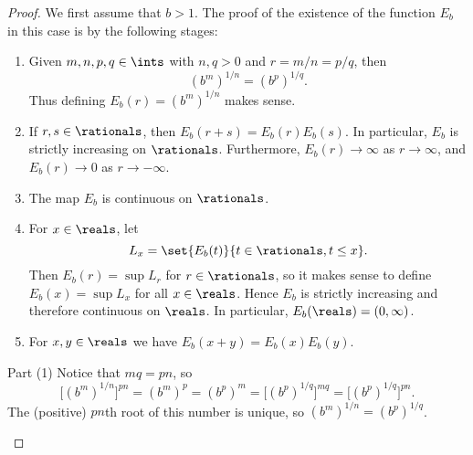 \documentclass[article, a4paper, 11pt, oneside]{memoir}
\numberwithin{equation}{chapter}
\begin{document}
\begin{proof}
    We first assume that $b > 1$. The proof of the existence of the function $E_b$ in this case is by the following stages:
    \begin{enumerate}
        \item Given $m,n,p,q \in \ints$ with $n,q > 0$ and $r = m/n = p/q$, then
        \begin{equation*}
            (b^m)^{1/n}
                = (b^p)^{1/q}.
        \end{equation*}
        Thus defining $E_b(r) = (b^m)^{1/n}$ makes sense.

        \item If $r,s \in \rationals$, then $E_b(r+s) = E_b(r) E_b(s)$. In particular, $E_b$ is strictly increasing on $\rationals$. Furthermore, $E_b(r) \to \infty$ as $r \to \infty$, and $E_b(r) \to 0$ as $r \to -\infty$.
        
        \item The map $E_b$ is continuous on $\rationals$.
        
        \item For $x \in \reals$, let
        \begin{equation*}
            L_x
                = \set{E_b(t)}{t \in \rationals, t \leq x}.
        \end{equation*}
        Then $E_b(r) = \sup L_r$ for $r \in \rationals$, so it makes sense to define $E_b(x) = \sup L_x$ for all $x \in \reals$. Hence $E_b$ is strictly increasing and therefore continuous on $\reals$. In particular, $E_b(\reals) = (0,\infty)$.

        \item For $x,y \in \reals$ we have $E_b(x+y) = E_b(x) E_b(y)$.
    \end{enumerate}
    
    \begin{proofsec}
        \item[Part (1)]
        Notice that $mq = pn$, so
        \begin{equation*}
            \bigl[ (b^m)^{1/n} \bigr]^{pn}
                = (b^m)^p
                = (b^p)^m
                = \bigl[ (b^p)^{1/q} \bigr]^{mq}
                = \bigl[ (b^p)^{1/q} \bigr]^{pn}.
        \end{equation*}
        The (positive) $pn$th root of this number is unique, so $(b^m)^{1/n} = (b^p)^{1/q}$.


\end{proofsec}
\end{proof}
\end{document}
